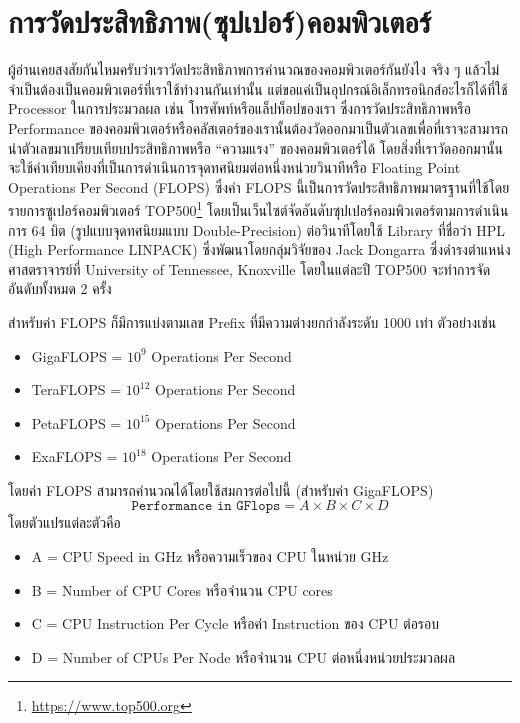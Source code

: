 \section{การวัดประสิทธิภาพ(ซุปเปอร์)คอมพิวเตอร์}

ผู้อ่านเคยสงสัยกันไหมครับว่าเราวัดประสิทธิภาพการคำนวณของคอมพิวเตอร์กันยังไง จริง ๆ แล้วไม่จำเป็นต้องเป็นคอมพิวเตอร์ที่เราใช้ทำงานกันเท่านั้น แต่ขอแค่เป็นอุปกรณ์อิเล็กทรอนิกส์อะไรก็ได้ที่ใช้ Processor ในการประมวลผล เช่น โทรศัพท์หรือแล็ปท็อปของเรา ซึ่งการวัดประสิทธิภาพหรือ Performance ของคอมพิวเตอร์หรือคลัสเตอร์ของเรานั้นต้องวัดออกมาเป็นตัวเลขเพื่อที่เราจะสามารถนำตัวเลขมาเปรียบเทียบประสิทธิภาพหรือ \enquote{ความแรง} ของคอมพิวเตอร์ได้ โดยสิ่งที่เราวัดออกมานั้นจะใช้ค่าเทียบเคียงที่เป็นการดำเนินการจุดทศนิยมต่อหนึ่งหน่วยวินาทีหรือ Floating Point Operations Per Second (FLOPS)  ซึ่งค่า FLOPS นี้เป็นการวัดประสิทธิภาพมาตรฐานที่ใช้โดยรายการซูเปอร์คอมพิวเตอร์ TOP500\footnote{\url{https://www.top500.org}} โดยเป็นเว็นไซต์จัดอันดับซุปเปอร์คอมพิวเตอร์ตามการดำเนินการ 64 บิต (รูปแบบจุดทศนิยมแบบ Double-Precision) ต่อวินาทีโดยใช้ Library ที่ชื่อว่า HPL (High Performance LINPACK) ซึ่งพัฒนาโดยกลุ่มวิจัยของ Jack Dongarra ซึ่งดำรงตำแหน่งศาสตราจารย์ที่ University of Tennessee, Knoxville โดยในแต่ละปี TOP500 จะทำการจัดอันดับทั้งหมด 2 ครั้ง

สำหรับค่า FLOPS ก็มีการแบ่งตามเลข Prefix ที่มีความต่างยกกำลังระดับ 1000 เท่า ตัวอย่างเช่น
%
\begin{itemize}[topsep=0pt,noitemsep]
  \setlength\itemsep{0.5em}
  \item GigaFLOPS = $10^{9}$ Operations Per Second

  \item TeraFLOPS = $10^{12}$ Operations Per Second

  \item PetaFLOPS = $10^{15}$ Operations Per Second

  \item ExaFLOPS = $10^{18}$ Operations Per Second
\end{itemize}
%
โดยค่า FLOPS สามารถคำนวณได้โดยใช้สมการต่อไปนี้ (สำหรับค่า GigaFLOPS)
%
\begin{equation}
  \texttt{Performance in GFlops} = A \times B \times C \times D
\end{equation}
%
โดยตัวแปรแต่ละตัวคือ
%
\begin{itemize}[topsep=0pt,noitemsep]
  \setlength\itemsep{0.5em}
  \item A = CPU Speed in GHz หรือความเร็วของ CPU ในหน่วย GHz

  \item B = Number of CPU Cores หรือจำนวน CPU cores

  \item C = CPU Instruction Per Cycle หรือค่า Instruction ของ CPU ต่อรอบ

  \item D = Number of CPUs Per Node หรือจำนวน CPU ต่อหนึ่งหน่วยประมวลผล
\end{itemize}

